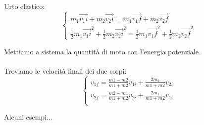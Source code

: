 \paragraph{}
 Urto elastico:
$$
\begin{cases}

    m_1\vec{v_1i} + m_2\vec{v_2i} = m_1\vec{v_1f} + m_2\vec{v_2f}\\[10pt]
    \frac{1}{2}m_1\vec{v_1i}^2 + \frac{1}{2}m_2\vec{v_2i}^2  =\frac{1}{2}m_1\vec{v_1f}^2 + \frac{1}{2}m_2\vec{v_2f}^2
     
\end{cases}
$$

Mettiamo a sistema la quantità di moto con l'energia potenziale.

\paragraph{}
Troviamo le velocità finali dei due corpi:
$$
\begin{cases}

    v_{1f} = \frac{m1 -m2}{m1+m2}v_{1i} + \frac{2m_2}{m1+m2}v_{2i}\\[10pt]
    v_{2f} = \frac{m2 -m1}{m1+m2}v_{2i} + \frac{2m_1}{m1+m2}v_{1i}\\
     
\end{cases}
$$

Alcuni esempi...


